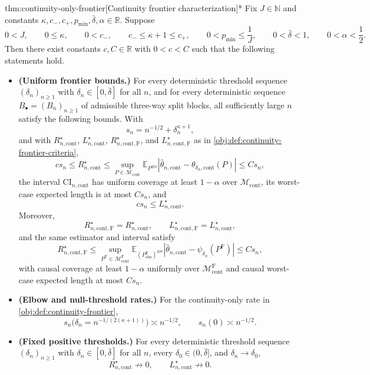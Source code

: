 \begin{theoremv}{thm:continuity-only-frontier}[Continuity frontier characterization]*
Fix \(J\in\mathbb N\) and constants \(\kappa,c_-,c_+,p_{\min},\bar\delta,\alpha\in\mathbb R\). Suppose
\[
0<J,
\qquad
0\leq \kappa,
\qquad
0<c_-,
\qquad
c_-\leq \kappa+1\leq c_+,
\qquad
0<p_{\min}\leq \frac{1}{J},
\qquad
0<\bar\delta<1,
\qquad
0<\alpha<\frac12.
\]
Then there exist constants \(c,C\in\mathbb R\) with \(0<c<C\) such that the following statements hold.

\begin{itemize}
\item \textbf{(Uniform frontier bounds.)} For every deterministic threshold sequence \((\delta_n)_{n\geq1}\) with \(\delta_n\in[0,\bar\delta]\) for all \(n\), and for every deterministic sequence \(B_{\bullet}=(B_n)_{n\geq1}\) of admissible three-way split blocks, all sufficiently large \(n\) satisfy the following bounds. With
\[
s_n=n^{-1/2}+\delta_n^{\kappa+1},
\]
and with \(R_{n,\mathrm{cont}}^\star\), \(L_{n,\mathrm{cont}}^\star\), \(R_{n,\mathrm{cont},\mathrm F}^\star\), and \(L_{n,\mathrm{cont},\mathrm F}^\star\) as in \cref{obj:def:continuity-frontier-criteria},
\[
c s_n\leq R_{n,\mathrm{cont}}^\star
\leq
\sup_{P\in\mathcal M_{\mathrm{cont}}}
\mathbb E_{P^{\otimes n}}
\left|\widehat\theta_{n,\mathrm{cont}}-\theta_{\delta_n,\mathrm{cont}}(P)\right|
\leq C s_n,
\]
the interval \(\mathrm{CI}_{n,\mathrm{cont}}\) has uniform coverage at least \(1-\alpha\) over \(\mathcal M_{\mathrm{cont}}\), its worst-case expected length is at most \(C s_n\), and
\[
c s_n\leq L_{n,\mathrm{cont}}^\star.
\]
Moreover,
\[
R_{n,\mathrm{cont},\mathrm F}^\star=R_{n,\mathrm{cont}}^\star,
\qquad
L_{n,\mathrm{cont},\mathrm F}^\star=L_{n,\mathrm{cont}}^\star,
\]
and the same estimator and interval satisfy
\[
R_{n,\mathrm{cont},\mathrm F}^\star
\leq
\sup_{P^{\mathrm F}\in\mathcal M_{\mathrm{cont}}^{\mathrm F}}
\mathbb E_{(P^{\mathrm F}_{\mathrm{obs}})^{\otimes n}}
\left|\widehat\theta_{n,\mathrm{cont}}-\psi_{\delta_n}(P^{\mathrm F})\right|
\leq C s_n,
\]
with causal coverage at least \(1-\alpha\) uniformly over \(\mathcal M_{\mathrm{cont}}^{\mathrm F}\) and causal worst-case expected length at most \(C s_n\).

\item \textbf{(Elbow and null-threshold rates.)} For the continuity-only rate in \cref{obj:def:continuity-frontier},
\[
s_n\bigl(\delta_n=n^{-1/(2(\kappa+1))}\bigr)
\asymp n^{-1/2},
\qquad
s_n(0)\asymp n^{-1/2}.
\]

\item \textbf{(Fixed positive thresholds.)} For every deterministic threshold sequence \((\delta_n)_{n\geq1}\) with \(\delta_n\in[0,\bar\delta]\) for all \(n\), every \(\delta_0\in(0,\bar\delta]\), and \(\delta_n\to\delta_0\),
\[
R_{n,\mathrm{cont}}^\star \not\to 0,
\qquad
L_{n,\mathrm{cont}}^\star \not\to 0.
\]
\end{itemize}
\end{theoremv}
